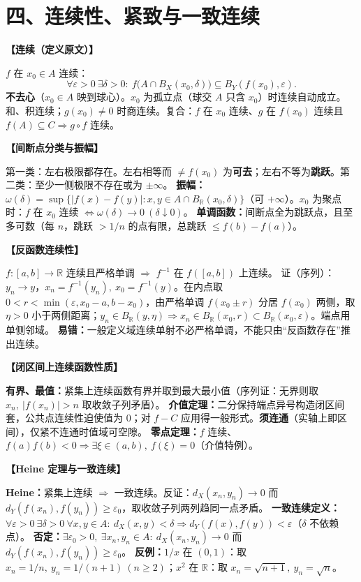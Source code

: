 \documentclass[12pt,a4paper,UTF8]{ctexart}
\newcommand{\R}{\mathbb R}
\newcommand{\eps}{\varepsilon}
\newenvironment{kp}[1]{\par\smallskip\noindent\textbf{【#1】}\par\nobreak\smallskip}{\par\smallskip}
\begin{document}
\section*{四、连续性、紧致与一致连续}

\begin{kp}{连续（定义原文）}
$f$ 在 $x_0\in A$ 连续：
\[
\forall\eps>0\ \exists\delta>0:\ f\bigl(A\cap B_X(x_0,\delta)\bigr)\subseteq B_Y(f(x_0),\eps).
\]
\textbf{不去心}（$x_0\in A$ 映到球心）。$x_0$ 为孤立点（球交 $A$ 只含 $x_0$）时连续自动成立。
和、积连续；$g(x_0)\ne0$ 时商连续。复合：$f$ 在 $x_0$ 连续、$g$ 在 $f(x_0)$ 连续且 $f(A)\subseteq C\Rightarrow g\circ f$ 连续。
\end{kp}

\begin{kp}{间断点分类与振幅}
第一类：左右极限都存在。左右相等而 $\ne f(x_0)$ 为\textbf{可去}；左右不等为\textbf{跳跃}。第二类：至少一侧极限不存在或为 $\pm\infty$。
\textbf{振幅：}$\omega(\delta)=\sup\{|f(x)-f(y)|:x,y\in A\cap B_\R(x_0,\delta)\}$（可 $+\infty$）。$x_0$ 为聚点时：$f$ 在 $x_0$ 连续 $\iff \omega(\delta)\to0\ (\delta\downarrow0)$。
\textbf{单调函数：}间断点全为跳跃点，且至多可数（每 $n$，跳跃 $>1/n$ 的点有限，总跳跃 $\le f(b)-f(a)$）。
\end{kp}

\begin{kp}{反函数连续性}
$f:[a,b]\to\R$ 连续且严格单调 $\Rightarrow$ $f^{-1}$ 在 $f([a,b])$ 上连续。
证（序列）：$y_n\to y$，$x_n=f^{-1}(y_n),\ x_0=f^{-1}(y)$。在内点取 $0<r<\min(\eps,x_0-a,b-x_0)$，由严格单调 $f(x_0\pm r)$ 分居 $f(x_0)$ 两侧，取 $\eta>0$ 小于两侧距离；$y_n\in B_\R(y,\eta)\Rightarrow x_n\in B_\R(x_0,r)\subset B_\R(x_0,\eps)$。端点用单侧邻域。
\textbf{易错：}一般定义域连续单射不必严格单调，不能只由“反函数存在”推出连续。
\end{kp}

\begin{kp}{闭区间上连续函数性质}
\textbf{有界、最值：}紧集上连续函数有界并取到最大最小值（序列证：无界则取 $x_n,\ |f(x_n)|>n$ 取收敛子列矛盾）。
\textbf{介值定理：}二分保持端点异号构造闭区间套，公共点连续性迫使值为 0；对 $f-C$ 应用得一般形式。\textbf{须连通}（实轴上即区间），仅紧不连通时值域可空隙。
\textbf{零点定理：}$f$ 连续、$f(a)f(b)<0\Rightarrow\exists\xi\in(a,b),\ f(\xi)=0$（介值特例）。
\end{kp}

\begin{kp}{Heine 定理与一致连续}
\textbf{Heine：}紧集上连续 $\Rightarrow$ 一致连续。反证：$d_X(x_n,y_n)\to0$ 而 $d_Y(f(x_n),f(y_n))\ge\eps_0$，取收敛子列两列趋同一点矛盾。
\textbf{一致连续定义：}$\forall\eps>0\ \exists\delta>0\ \forall x,y\in A:\ d_X(x,y)<\delta\Rightarrow d_Y(f(x),f(y))<\eps$（$\delta$ 不依赖点）。
\textbf{否定：}$\exists\eps_0>0,\ \exists x_n,y_n\in A:\ d_X(x_n,y_n)\to0$ 而 $d_Y(f(x_n),f(y_n))\ge\eps_0$。
\textbf{反例：}$1/x$ 在 $(0,1)$：取 $x_n=1/n,\ y_n=1/(n+1)\ (n\ge2)$；$x^2$ 在 $\R$：取 $x_n=\sqrt{n+1},\ y_n=\sqrt n$。
\end{kp}
\end{document}
